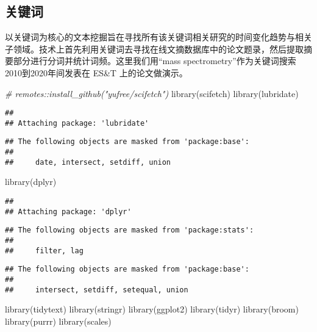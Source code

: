 \documentclass[]{tufte-book}
\newenvironment{Shaded}{}{}
\newcommand{\CommentTok}[1]{\textcolor[rgb]{0.38,0.63,0.69}{\textit{#1}}}
\newcommand{\FunctionTok}[1]{\textcolor[rgb]{0.02,0.16,0.49}{#1}}
\newcommand{\NormalTok}[1]{#1}
\begin{document}
\hypertarget{ux5173ux952eux8bcd}{%
\subsection{关键词}\label{ux5173ux952eux8bcd}}

以关键词为核心的文本挖掘旨在寻找所有该关键词相关研究的时间变化趋势与相关子领域。技术上首先利用关键词去寻找在线文摘数据库中的论文题录，然后提取摘要部分进行分词并统计词频。这里我们用``mass spectrometry''作为关键词搜索2010到2020年间发表在 ES\&T 上的论文做演示。

\begin{Shaded}
\begin{Highlighting}[]
\CommentTok{\# remotes::install\_github("yufree/scifetch")}
\FunctionTok{library}\NormalTok{(scifetch)}
\FunctionTok{library}\NormalTok{(lubridate)}
\end{Highlighting}
\end{Shaded}

\begin{verbatim}
## 
## Attaching package: 'lubridate'
\end{verbatim}

\begin{verbatim}
## The following objects are masked from 'package:base':
## 
##     date, intersect, setdiff, union
\end{verbatim}

\begin{Shaded}
\begin{Highlighting}[]
\FunctionTok{library}\NormalTok{(dplyr)}
\end{Highlighting}
\end{Shaded}

\begin{verbatim}
## 
## Attaching package: 'dplyr'
\end{verbatim}

\begin{verbatim}
## The following objects are masked from 'package:stats':
## 
##     filter, lag
\end{verbatim}

\begin{verbatim}
## The following objects are masked from 'package:base':
## 
##     intersect, setdiff, setequal, union
\end{verbatim}

\begin{Shaded}
\begin{Highlighting}[]
\FunctionTok{library}\NormalTok{(tidytext)}
\FunctionTok{library}\NormalTok{(stringr)}
\FunctionTok{library}\NormalTok{(ggplot2)}
\FunctionTok{library}\NormalTok{(tidyr)}
\FunctionTok{library}\NormalTok{(broom)}
\FunctionTok{library}\NormalTok{(purrr)}
\FunctionTok{library}\NormalTok{(scales)}
\end{Highlighting}
\end{Shaded}
\end{document}

